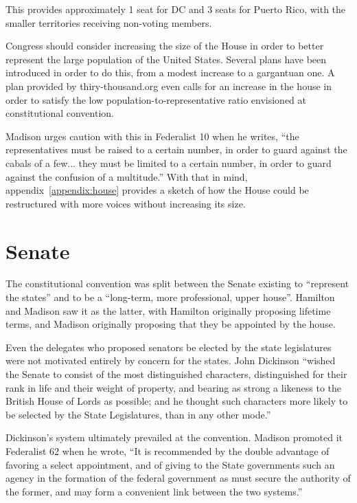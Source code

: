 \documentclass{article}
\newcommand{\quotes}[1]{``#1''}
\begin{document}
This provides approximately 1 seat for DC and 3 seats for Puerto Rico, with the smaller territories receiving non-voting members.

Congress should consider increasing the size of the House in order to better represent the large population of the United States. Several plans have been introduced in order to do this, from a modest increase to a gargantuan one\cite{Allen}. A plan provided by thiry-thousand.org even calls for an increase in the house in order to satisfy the low population-to-representative ratio envisioned at constitutional convention\cite{30000}.

Madison urges caution with this in Federalist 10 when he writes, \quotes{the representatives must be raised to a certain number, in order to guard against the cabals of a few... they must be limited to a certain number, in order to guard against the confusion of a multitude.}\cite{Federalist10} With that in mind, appendix~\ref{appendix:house} provides a sketch of how the House could be restructured with more voices without increasing its size.

\section{Senate}
\label{section:Senate}

The constitutional convention was split between the Senate existing to \quotes{represent the states} and to be a \quotes{long-term, more professional, upper house}. Hamilton and Madison saw it as the latter, with Hamilton originally proposing lifetime terms, and Madison originally proposing that they be appointed by the house.

Even the delegates who proposed senators be elected by the state legislatures were not motivated entirely by concern for the states. John Dickinson \quotes{wished the Senate to consist of the most distinguished characters, distinguished for their rank in life and their weight of property, and bearing as strong a likeness to the British House of Lords as possible; and he thought such characters more likely to be selected by the State Legislatures, than in any other mode.}\cite{Madison}

Dickinson's system ultimately prevailed at the convention. Madison promoted it Federalist 62 when he wrote, \quotes{It is recommended by the double advantage of favoring a select appointment, and of giving to the State governments such an agency in the formation of the federal government as must secure the authority of the former, and may form a convenient link between the two systems.}\cite{Federalist62}
\end{document}
